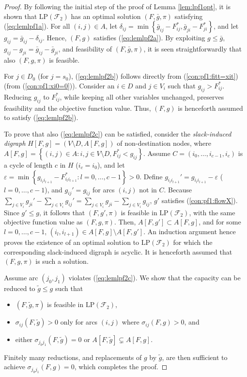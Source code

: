 \begin{proof}
By following the initial step of the proof of Lemma \ref{lem:lpf1opt},
it is shown that $\text{LP}(\mathcal{F}_2)$ has an optimal solution $(F,\bar{g},\pi)$ satisfying (\ref{eq:lemlpf1a}).
For all $(i,j)\in A$, let $\delta_{ij}=\min\left\{\bar{g}_{ij}-F_{ij}^*, \bar{g}_{ji}-F_{ji}^*\right\}$,
and let $g_{ij}=\bar{g}_{ij}-\delta_{ij}$.
Hence, $(F,g)$ satisfies (\ref{eq:lemlpf2a}).
By exploiting $g\leq\bar{g}$, $g_{ij}-g_{ji}=\bar{g}_{ij}-\bar{g}_{ji}$, and feasibility of $(F,\bar{g},\pi)$,
it is seen straightforwardly that also $(F,g,\pi)$ is feasible.

For $j\in D_0$ (for $j=s_0$), (\ref{eq:lemlpf2b}) follows directly from (\ref{con:pf1:fitt=xit}) (from (\ref{con:pf1:xi0=0})).
Consider an $i\in D$ and $j\in V_i$ such that $g_{ij}>F_{ij}^*$.
Reducing $g_{ij}$ to $F_{ij}^*$, while keeping all other variables unchanged, preserves feasibility and the objective function value.
Thus, $(F,g)$ is henceforth assumed to satisfy (\ref{eq:lemlpf2b}).

To prove that also (\ref{eq:lemlpf2c}) can be satisfied,
consider the \emph{slack-induced digraph} $H[F,g]=(V\setminus D,A[F,g])$ of non-destination nodes, where
$A[F,g]=\left\{(i,j)\in A: i,j\in V\setminus D, F_{ij}^* < g_{ij}\right\}$.
Assume $C=(i_0,\ldots,i_{c-1}, i_c)$ is a cycle of length $c$ in $H$ ($i_c=i_0$),
and let $\varepsilon = \min\left\{g_{i_li_{l+1}}-F_{i_li_{l+1}}^*: l=0,\ldots,c-1\right\}>0$.
Define $g_{i_li_{l+1}}'=g_{i_li_{l+1}}-\varepsilon$ ($l=0,\ldots,c-1$), and $g_{ij}'=g_{ij}$ for arcs $(i,j)$ not in $C$.
Because $\sum_{j\in V_i}g_{ji}'-\sum_{j\in V_i}g_{ij}' = \sum_{j\in V_i}g_{ji}-\sum_{j\in V_i}g_{ij}$,
$g'$ satisfies (\ref{con:pf1:flowX}).
Since $g'\leq g$, it follows that $(F,g',\pi)$ is feasible in $\text{LP}(\mathcal{F}_2)$, with the same objective function value as $(F,g,\pi)$.
Then, $A[F,g']\subset A[F,g]$, and for some $l=0,\ldots,c-1$, $(i_l,i_{l+1})\in A[F,g]\setminus A[F,g']$.
An induction argument hence proves the existence of an optimal solution to $\text{LP}(\mathcal{F}_2)$ for which the corresponding slack-induced digraph is acyclic.
It is henceforth assumed that $(F,g,\pi)$ is such a solution.

Assume arc $(j_0,j_1)$ violates (\ref{eq:lemlpf2c}).
We show that the capacity can be reduced to $\tilde{g}\leq g$ such that
\begin{itemize}
  \item $(F,\tilde{g},\pi)$ is feasible in $\text{LP}(\mathcal{F}_2)$,
  \item $\sigma_{ij}(F,\tilde{g})>0$ only for arcs $(i,j)$ where $\sigma_{ij}(F,g)>0$, and
  \item either $\sigma_{j_0j_1}(F,\tilde{g})=0$ or $A[F,\tilde{g}]\subsetneq A[F,g]$.
\end{itemize}
\noindent
Finitely many reductions, and replacements of $g$ by $\tilde{g}$, are then sufficient to achieve $\sigma_{j_0j_1}(F,g)=0$, which completes the proof.


\end{proof}
